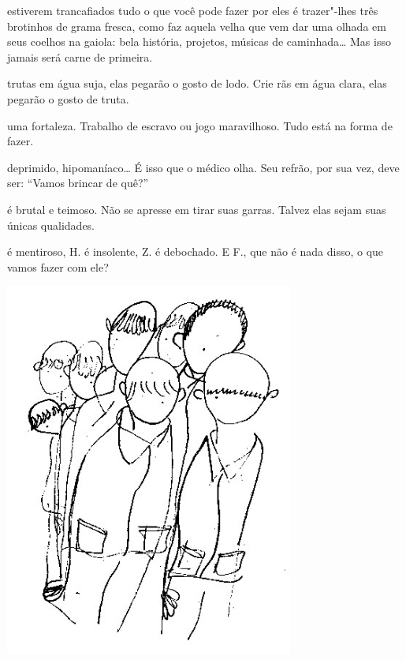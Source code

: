 \pagebreak

 estiverem trancafiados tudo o que você pode fazer por eles é
trazer"-lhes três brotinhos de grama fresca, como faz aquela velha que
vem dar uma olhada em seus coelhos na gaiola: bela história, projetos,
músicas de caminhada\ldots{} Mas isso jamais será carne de primeira.


 trutas em água suja, elas pegarão o gosto de lodo. Crie rãs em água
clara, elas pegarão o gosto de truta.



 uma fortaleza. Trabalho de escravo ou jogo maravilhoso. Tudo
está na forma de fazer.



 deprimido, hipomaníaco\ldots{} É isso que o médico olha. Seu
refrão, por sua vez, deve ser: ``Vamos brincar de quê?''



 é brutal e teimoso. Não se apresse em tirar suas garras. Talvez elas
sejam suas únicas qualidades.



 é mentiroso, H. é insolente, Z. é debochado. E F., que não é nada
disso, o que vamos fazer com ele?

\pagebreak


\pagebreak
\thispagestyle{empty}

\begin{vplace}[.50]
\begin{center}
\includegraphics[width=95mm]{./imgs/Image_10.jpg}
\end{center}
\end{vplace}

